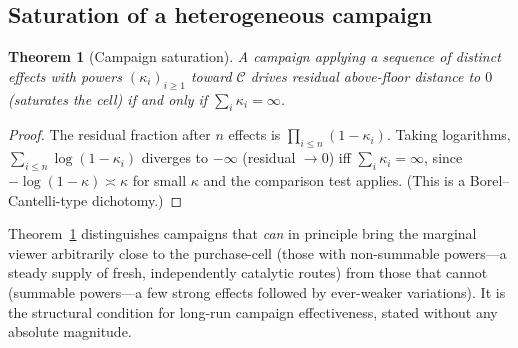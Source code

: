 \documentclass[twocolumn,11pt,a4paper]{article}
\theoremstyle{adv}
\newtheorem{theorem}{Theorem}[section]
\theoremstyle{definition}
\theoremstyle{remark}
\newcommand{\Cell}{\mathcal{C}}        %
\newcommand{\pot}{\kappa}             %
\begin{document}
\subsection{Saturation of a heterogeneous campaign}

\begin{theorem}[Campaign saturation]
\label{thm:saturation}
A campaign applying a sequence of distinct effects with powers
$(\pot_i)_{i\ge1}$ toward $\Cell$ drives residual above-floor distance to
$0$ (saturates the cell) if and only if $\sum_i\pot_i=\infty$.
\end{theorem}

\begin{proof}
The residual fraction after $n$ effects is $\prod_{i\le n}(1-\pot_i)$.
Taking logarithms, $\sum_{i\le n}\log(1-\pot_i)$ diverges to $-\infty$
(residual $\to0$) iff $\sum_i\pot_i=\infty$, since
$-\log(1-\pot)\asymp\pot$ for small $\pot$ and the comparison test
applies. (This is a Borel--Cantelli-type dichotomy.)
\end{proof}

Theorem~\ref{thm:saturation} distinguishes campaigns that \emph{can} in
principle bring the marginal viewer arbitrarily close to the purchase-cell
(those with non-summable powers---a steady supply of fresh, independently
catalytic routes) from those that cannot (summable powers---a few strong
effects followed by ever-weaker variations). It is the structural
condition for long-run campaign effectiveness, stated without any absolute
magnitude.
\end{document}
